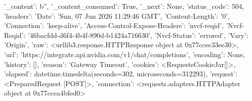 
{'_content': b'', '_content_consumed': True, '_next': None, 'status_code': 504, 'headers': {'Date': 'Sun, 07 Jun 2026 11:29:46 GMT', 'Content-Length': '0', 'Connection': 'keep-alive', 'Access-Control-Expose-Headers': 'nvcf-reqid', 'Nvcf-Reqid': '46bacfdd-d6f4-4b4f-890d-b1424a716630', 'Nvcf-Status': 'errored', 'Vary': 'Origin'}, 'raw': <urllib3.response.HTTPResponse object at 0x77ccec33ee30>, 'url': 'https://integrate.api.nvidia.com/v1/chat/completions', 'encoding': None, 'history': [], 'reason': 'Gateway Timeout', 'cookies': <RequestsCookieJar[]>, 'elapsed': datetime.timedelta(seconds=302, microseconds=312293), 'request': <PreparedRequest [POST]>, 'connection': <requests.adapters.HTTPAdapter object at 0x77ccea4bfed0>}
